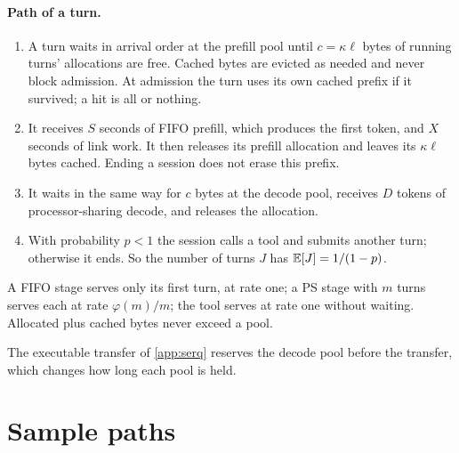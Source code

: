 \paragraph{Path of a turn.}\label{L6:def:path} \begin{enumerate}[label=(\roman*)]
\item A turn waits in arrival order at the prefill pool until $c=\kappa\ell$ bytes of
  running turns' allocations are free. Cached bytes are evicted as needed and never
  block admission. At admission the turn uses its own cached prefix if it survived;
  a hit is all or nothing.
\item It receives $S$ seconds of FIFO prefill, which produces the first token, and
  $X$ seconds of link work. It then releases its prefill allocation and leaves its
  $\kappa\ell$ bytes cached. Ending a session does not erase this prefix.
\item It waits in the same way for $c$ bytes at the decode pool, receives $D$ tokens of
  processor-sharing decode, and releases the allocation.
\item With probability $p<1$ the session calls a tool and submits another turn;
  otherwise it ends. So the number of turns $J$ has $\mathbb{E}[J]=1/(1-p)$.
\end{enumerate}
A FIFO stage serves only its first turn, at rate one; a PS stage with $m$ turns serves
each at rate $\varphi(m)/m$; the tool serves at rate one without waiting. Allocated plus
cached bytes never exceed a pool.

The executable transfer of \cref{app:serq} reserves the decode pool before the
transfer, which changes how long each pool is held.

\section{Sample paths}\label{L6:sec:paths}

